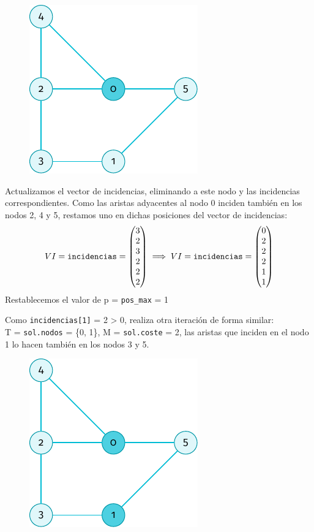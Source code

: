\documentclass[11pt]{article}
\begin{document}
\begin{figure}[H]
	\centering \includegraphics{./img/grafo-ejemplo-1.pdf}
\end{figure}

Actualizamos el vector de incidencias, eliminando a este nodo y las incidencias correspondientes. Como las aristas adyacentes al nodo 0 inciden también en los nodos 2, 4 y 5, restamos uno en dichas posiciones del vector de incidencias: \\
$$ VI = \verb|incidencias| = 
\begin{pmatrix}
	3 \\
	2 \\
	3 \\
	2 \\
	2 \\
	2 
\end{pmatrix} \implies VI = \verb|incidencias| = 
\begin{pmatrix}
	0 \\
	2 \\
	2 \\
	2 \\
	1 \\
	1 
\end{pmatrix}$$
Restablecemos el valor de p = \verb|pos_max| = 1

Como \verb|incidencias[1]| = 2 > 0, realiza otra iteración de forma similar:\\
 
 T = \verb|sol.nodos| = \{0, 1\}, M = \verb|sol.coste| = 2, las aristas que inciden en el nodo 1 lo hacen también en los nodos 3 y 5.\\
 
\begin{figure}[H]
	\centering \includegraphics{./img/grafo-ejemplo-2.pdf}
\end{figure}
 
\end{document}
